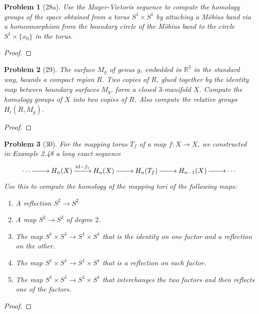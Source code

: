 \documentclass[10pt]{article}
\newcommand{\sk}{\vskip 10mm}
\newcommand{\bb}[1]{\mathbb{#1}}
\theoremstyle{plain}
\newtheorem{problem}{Problem}
\theoremstyle{remark}
\begin{document}
\begin{problem}[28a]
  Use the Mayer-Vietoris sequence to compute the homology groups of the space
  obtained from a torus $S^1\times S^1$ by attaching a M\"obius band via a
  homeomorphism from the boundary circle of the M\"obius band to the
  circle $S^1\times \{ x_0\}$ in the torus.
\end{problem}

\begin{proof}
  
\end{proof}

\sk

\begin{problem}[29]
  The surface $M_g$ of genus $g$, embedded in $\bb{R}^3$ in the standard way,
  bounds a compact region $R$. Two copies of $R$, glued together by the identity
  map between boundary surfaces $M_g$, form a closed $3$-manifold $X$.
  Compute the homology groups of $X$ into two copies of $R$. Also compute the
  relative groups $H_i(R,M_g)$.
\end{problem}

\begin{proof}
  
\end{proof}

\sk

\begin{problem}[30]
  For the mapping torus $T_f$ of a map $f: X\rightarrow X$,
  we constructed in Example 2.48 a long exact sequence
  \[
    \xymatrix{
      \cdots \ar[r] & H_n(X) \ar[r]^{\mathrm{id}-f_*} & H_n(X) \ar[r] & H_n(T_f) \ar[r] & H_{n-1}(X) \ar[r] & \cdots
    }
  \]
  Use this to compute the homology of the mapping tori of the following maps:
  \begin{enumerate}
  \item[(a)] A reflection $S^2\rightarrow S^2$
  \item[(b)] A map $S^2\rightarrow S^2$ of degree $2$.
  \item[(c)] The map $S^1\times S^1\rightarrow S^1\times S^1$ that is the
    identity on one factor and a reflection on the other.
  \item[(d)] The map $S^1\times S^1\rightarrow S^1\times S^1$ that is a
    reflection on each factor.
  \item[(e)] The map $S^1\times S^1\rightarrow S^1\times S^1$ that interchanges
    the two factors and then reflects one of the factors.
  \end{enumerate}
\end{problem}

\begin{proof}
  
\end{proof}

\sk

\end{document}
